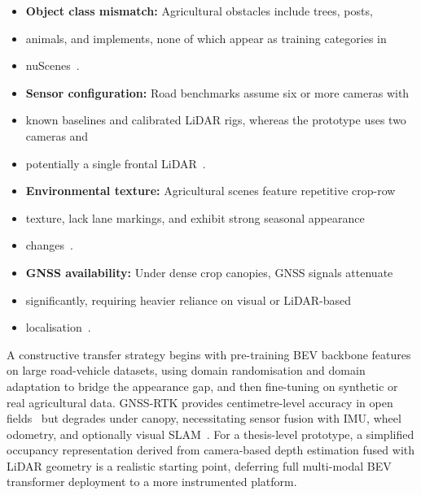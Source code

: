\documentclass[12pt, a4paper]{article}
\begin{document}
\begin{itemize}
  \item \textbf{Object class mismatch:} Agricultural obstacles include trees, posts,
  \item animals, and implements, none of which appear as training categories in
  \item nuScenes~\cite{ref2}.
  \item \textbf{Sensor configuration:} Road benchmarks assume six or more cameras with
  \item known baselines and calibrated LiDAR rigs, whereas the prototype uses two cameras and
  \item potentially a single frontal LiDAR~\cite{ref1, ref2}.
  \item \textbf{Environmental texture:} Agricultural scenes feature repetitive crop-row
  \item texture, lack lane markings, and exhibit strong seasonal appearance
  \item changes~\cite{ref32, ref35}.
  \item \textbf{GNSS availability:} Under dense crop canopies, GNSS signals attenuate
  \item significantly, requiring heavier reliance on visual or LiDAR-based
  \item localisation~\cite{ref30, ref35}.
\end{itemize}

A constructive transfer strategy begins with pre-training BEV backbone features on large
road-vehicle datasets, using domain randomisation and domain adaptation to bridge the
appearance gap, and then fine-tuning on synthetic or real agricultural data. GNSS-RTK
provides centimetre-level accuracy in open fields~\cite{ref32} but degrades under canopy,
necessitating sensor fusion with IMU, wheel odometry, and optionally visual
SLAM~\cite{ref37, ref85, ref93}. For a thesis-level prototype, a simplified occupancy
representation derived from camera-based depth estimation fused with LiDAR geometry is a
realistic starting point, deferring full multi-modal BEV transformer deployment to a more
instrumented platform.
\end{document}
